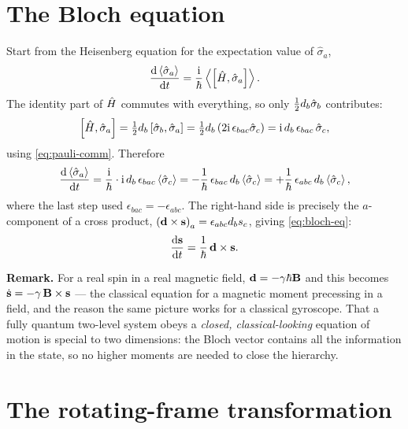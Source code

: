 \section{The Bloch equation}
\label{app:blocheq}

Start from the Heisenberg equation for the expectation value of $\hat\sigma_a$,
%
\begin{equation}
\frac{\mathrm{d}\Braket{\hat\sigma_a}}{\mathrm{d} t}
  = \frac{\mathrm{i}}{\hbar}\Braket{\left[\hat{H},\hat\sigma_a\right]}.
\end{equation}
%
The identity part of $\hat{H}$ commutes with everything, so only
$\tfrac{1}{2} d_b\hat\sigma_b$ contributes:
%
\begin{equation}
\left[\hat{H},\hat\sigma_a\right]
 = \tfrac{1}{2} d_b\left[\hat\sigma_b,\hat\sigma_a\right]
 = \tfrac{1}{2} d_b\left(2\mathrm{i}\,\epsilon_{bac}\hat\sigma_c\right)
 = \mathrm{i}\, d_b\,\epsilon_{bac}\,\hat\sigma_c ,
\end{equation}
%
using \cref{eq:pauli-comm}. Therefore
%
\begin{equation}
\frac{\mathrm{d}\Braket{\hat\sigma_a}}{\mathrm{d} t}
 = \frac{\mathrm{i}}{\hbar}\cdot \mathrm{i}\,d_b\,\epsilon_{bac}\Braket{\hat\sigma_c}
 = -\frac{1}{\hbar}\,\epsilon_{bac}\,d_b\Braket{\hat\sigma_c}
 = +\frac{1}{\hbar}\,\epsilon_{abc}\,d_b\Braket{\hat\sigma_c},
\end{equation}
%
where the last step used $\epsilon_{bac} = -\epsilon_{abc}$. The right-hand side is
precisely the $a$-component of a cross product,
$\left(\mathbf{d}\times\mathbf{s}\right)_a = \epsilon_{abc}d_b s_c$, giving \cref{eq:bloch-eq}:
%
\begin{equation}
\frac{\mathrm{d}\mathbf{s}}{\mathrm{d} t} = \frac{1}{\hbar}\,\mathbf{d}\times\mathbf{s} .
\end{equation}

\noindent
\textbf{Remark.} For a real spin in a real magnetic field, $\mathbf{d} = -\gamma\hbar\mathbf{B}$
and this becomes $\dot{\mathbf{s}} = -\gamma\,\mathbf{B}\times\mathbf{s}$ --- the classical
equation for a magnetic moment precessing in a field, and the reason the same picture
works for a classical gyroscope. That a fully quantum two-level system obeys a
\emph{closed, classical-looking} equation of motion is special to two dimensions: the
Bloch vector contains all the information in the state, so no higher moments are needed
to close the hierarchy.

\section{The rotating-frame transformation}
\label{app:rotframe}

